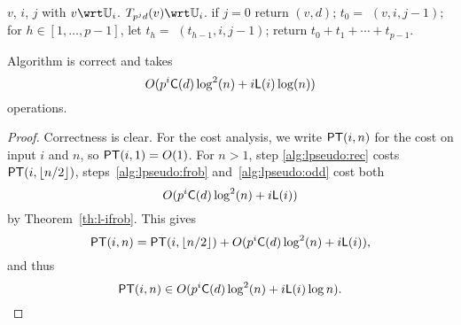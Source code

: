 \begin{algorithm}
  \caption{}
  \label{alg:pseudotrace}
  \begin{algorithmic}[1]
    \REQUIRE $v$, $i$, $j$ with $v\wrt\U_i$.
    \ENSURE $T_{p^jd}(v) \wrt \U_i$.
    \STATE \label{alg:pseudo:base} if $j = 0$ return $(v, d)$;
    \STATE \label{alg:pseudo:rec} $t_0=$ $(v, i, j-1)$;
    \STATE \label{alg:pseudo:frob}for $h\in [1,\dots,p-1]$, let $t_h=$ $(t_{h-1}, i, j-1)$;
    \STATE \label{alg:pseudo:sum}return $t_0 + t_1 + \cdots + t_{p-1}$.
  \end{algorithmic}
\end{algorithm}

\begin{theorem}
  \label{th:l-pseudo}
  Algorithm  is correct and takes 
  \begin{equation}
    \label{eq:96}
    O(p^i\mathsf{C}(d)\log^2 (n) + i \mathsf{L}(i)\log (n))
  \end{equation}
  operations.
\end{theorem}
\begin{proof}
  Correctness is clear. For the cost analysis, we write $\mathsf{PT}(i,n)$
  for the cost on input $i$ and $n$, so $\mathsf{PT}(i,1)=O(1)$.  For $n>1$,
  step \ref{alg:lpseudo:rec} costs $\mathsf{PT}(i,\lfloor n/2 \rfloor)$,
  steps~\ref{alg:lpseudo:frob} and~\ref{alg:lpseudo:odd} cost both
  \begin{equation}
    \label{eq:100}
    O(p^i\mathsf{C}(d)\log^2 (n) + i \mathsf{L}(i))
  \end{equation}
  by Theorem~\ref{th:l-ifrob}. This gives
  \begin{equation}
    \label{eq:98}
    \mathsf{PT}(i,n) = \mathsf{PT}(i,\lfloor
    n/2\rfloor) +O(p^i\mathsf{C}(d)\log^2 (n) + i \mathsf{L}(i))
    \text{,}
  \end{equation}
  and thus
  \begin{equation}
    \label{eq:99}
    \mathsf{PT}(i,n) \in O(p^i\mathsf{C}(d)\log^2 (n) + i \mathsf{L}(i)\log n)
    \text{.}
  \end{equation}
\end{proof}


